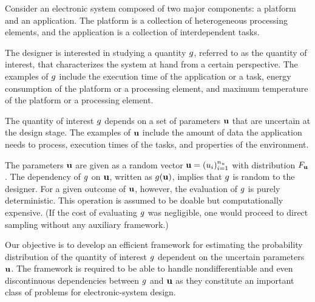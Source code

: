 Consider an electronic system composed of two major components: a platform and
an application. The platform is a collection of heterogeneous processing
elements, and the application is a collection of interdependent tasks.

The designer is interested in studying a quantity $g$, referred to as the
quantity of interest, that characterizes the system at hand from a certain
perspective. The examples of $g$ include the execution time of the application
or a task, energy consumption of the platform or a processing element, and
maximum temperature of the platform or a processing element.

The quantity of interest $g$ depends on a set of parameters $\mathbf{u}$ that are
uncertain at the design stage. The examples of $\mathbf{u}$ include the amount of data
the application needs to process, execution times of the tasks, and properties
of the environment.

The parameters $\mathbf{u}$ are given as a random vector $\mathbf{u} = (u_i)_{i = 1}^{n_u}$
with distribution $F_{\mathbf{u}}$. The dependency of $g$ on $\mathbf{u}$, written
as $g(\mathbf{u})$, implies that $g$ is random to the designer. For a given outcome
of $\mathbf{u}$, however, the evaluation of $g$ is purely deterministic. This
operation is assumed to be doable but computationally expensive. (If the cost of
evaluating $g$ was negligible, one would proceed to direct sampling without any
auxiliary framework.)

Our objective is to develop an efficient framework for estimating the
probability distribution of the quantity of interest $g$ dependent on the
uncertain parameters $\mathbf{u}$. The framework is required to be able to handle
nondifferentiable and even discontinuous dependencies between $g$ and $\mathbf{u}$ as
they constitute an important class of problems for electronic-system design.
